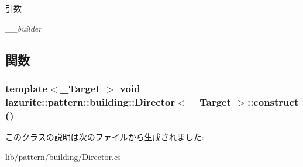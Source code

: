 \begin{DoxyParams}{引数}
\item[{\em \_\-\_\-builder}]\end{DoxyParams}


\subsection{関数}
\hypertarget{classlazurite_1_1pattern_1_1building_1_1_director_3_01___target_01_4_a04573e86602f5d609ebcca589c36cb4f}{
\subsubsection[{construct}]{\setlength{\rightskip}{0pt plus 5cm}template$<$\_\-Target $>$ void lazurite::pattern::building::Director$<$ \_\-Target $>$::construct ()}}
\label{classlazurite_1_1pattern_1_1building_1_1_director_3_01___target_01_4_a04573e86602f5d609ebcca589c36cb4f}


このクラスの説明は次のファイルから生成されました:\begin{DoxyCompactItemize}
\item 
lib/pattern/building/Director.cs\end{DoxyCompactItemize}
